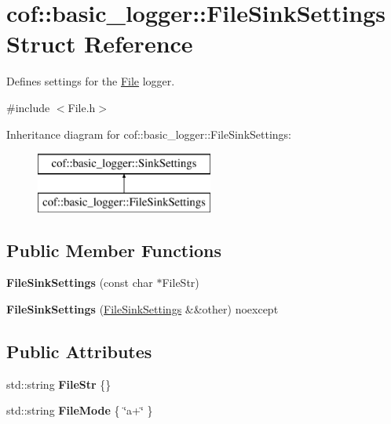 \hypertarget{structcof_1_1basic__logger_1_1_file_sink_settings}{}\section{cof\+:\+:basic\+\_\+logger\+:\+:File\+Sink\+Settings Struct Reference}
\label{structcof_1_1basic__logger_1_1_file_sink_settings}


Defines settings for the \hyperlink{classcof_1_1basic__logger_1_1_file}{File} logger.  




{\ttfamily \#include $<$File.\+h$>$}

Inheritance diagram for cof\+:\+:basic\+\_\+logger\+:\+:File\+Sink\+Settings\+:\begin{figure}[H]
\begin{center}
\leavevmode
\includegraphics[height=2.000000cm]{structcof_1_1basic__logger_1_1_file_sink_settings}
\end{center}
\end{figure}
\subsection*{Public Member Functions}
\begin{DoxyCompactItemize}
\item 
\mbox{\label{structcof_1_1basic__logger_1_1_file_sink_settings_abc2a4e9ac5fe20c21b7bf95684c6e2b3}} 
{\bfseries File\+Sink\+Settings} (const char $\ast$File\+Str)
\item 
\mbox{\label{structcof_1_1basic__logger_1_1_file_sink_settings_a1cda01667d68b065091959015b13619a}} 
{\bfseries File\+Sink\+Settings} (\hyperlink{structcof_1_1basic__logger_1_1_file_sink_settings}{File\+Sink\+Settings} \&\&other) noexcept
\end{DoxyCompactItemize}
\subsection*{Public Attributes}
\begin{DoxyCompactItemize}
\item 
\mbox{\label{structcof_1_1basic__logger_1_1_file_sink_settings_a67a672d20da69ca7b856f0af464651c8}} 
std\+::string {\bfseries File\+Str} \{\}
\item 
\mbox{\label{structcof_1_1basic__logger_1_1_file_sink_settings_a8c2e26cdb44227a7e77dfe7488bed7a0}} 
std\+::string {\bfseries File\+Mode} \{ \char`\"{}a+\char`\"{} \}
\end{DoxyCompactItemize}


